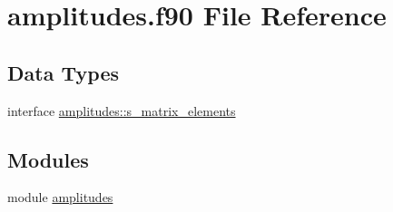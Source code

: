 \hypertarget{amplitudes_8f90}{}\section{amplitudes.\+f90 File Reference}
\label{amplitudes_8f90}
\subsection*{Data Types}
\begin{DoxyCompactItemize}
\item 
interface \hyperlink{interfaceamplitudes_1_1s__matrix__elements}{amplitudes\+::s\+\_\+matrix\+\_\+elements}
\end{DoxyCompactItemize}
\subsection*{Modules}
\begin{DoxyCompactItemize}
\item 
module \hyperlink{namespaceamplitudes}{amplitudes}
\end{DoxyCompactItemize}
